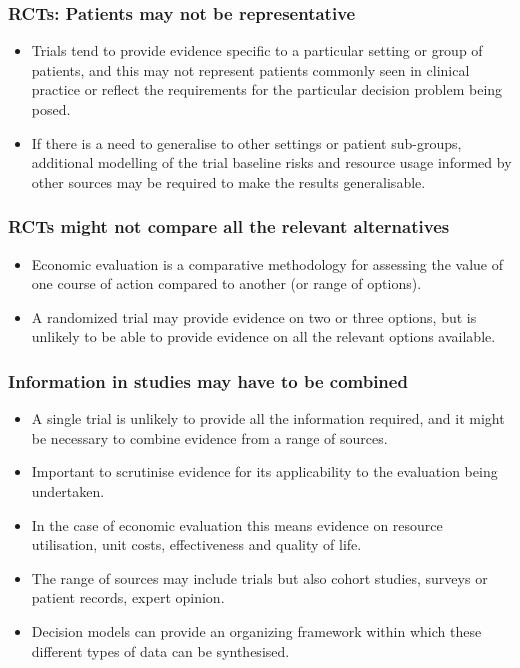 \documentclass[t]{beamer}
\begin{document}
\begin{frame}
\frametitle{RCTs: Patients may not be representative}

	\begin{itemize}
		\item Trials tend to provide evidence \alert{specific} to a particular setting or group of patients, and this may not represent patients commonly seen in \alert{clinical practice} or reflect the requirements for the particular decision problem being posed.
		\item If there is a need to generalise to other settings or patient sub-groups, additional modelling of the trial baseline risks and resource usage informed by other sources may be required to make the results \alert{generalisable}.
\end{itemize}
\end{frame}


\begin{frame}
\frametitle{RCTs might not compare all the relevant alternatives}

	\begin{itemize}
		\item Economic evaluation is a comparative methodology for assessing the value of one course of action compared to another (or range of options).
		\item A randomized trial may provide evidence on two or three options, but is unlikely to be able to provide evidence on \alert{all the relevant options} available.
\end{itemize}
\end{frame}


\begin{frame}
\frametitle{Information in studies may have to be combined}
	\begin{itemize}
		\item A single trial is unlikely to provide all the information required, and it might be necessary to combine evidence from a \alert{range of sources}.
		\item Important to scrutinise evidence for its applicability to the evaluation being undertaken.
		\item In the case of economic evaluation this means evidence on \alert{resource utilisation, unit costs, effectiveness and quality of life}.
		\item The range of sources may include trials but also \alert{cohort studies, surveys or patient records, expert opinion}.
		\item Decision models can provide an organizing framework within which these different types of data can be synthesised.
\end{itemize}
\end{frame}
\end{document}

